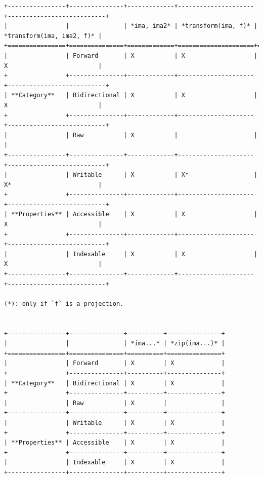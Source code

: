 \begin{verbatim}
+----------------+---------------+-------------+---------------------+---------------------------+
|                |               | *ima, ima2* | *transform(ima, f)* | *transform(ima, ima2, f)* |
+================+===============+=============+=====================+===========================+
|                | Forward       | X           | X                   | X                         |
+                +---------------+-------------+---------------------+---------------------------+
| **Category**   | Bidirectional | X           | X                   | X                         |
+                +---------------+-------------+---------------------+---------------------------+
|                | Raw           | X           |                     |                           |
+----------------+---------------+-------------+---------------------+---------------------------+
|                | Writable      | X           | X*                  | X*                        |
+                +---------------+-------------+---------------------+---------------------------+
| **Properties** | Accessible    | X           | X                   | X                         |
+                +---------------+-------------+---------------------+---------------------------+
|                | Indexable     | X           | X                   | X                         |
+----------------+---------------+-------------+---------------------+---------------------------+

(*): only if `f` is a projection.


+----------------+---------------+----------+---------------+
|                |               | *ima...* | *zip(ima...)* |
+================+===============+==========+===============+
|                | Forward       | X        | X             |
+                +---------------+----------+---------------+
| **Category**   | Bidirectional | X        | X             |
+                +---------------+----------+---------------+
|                | Raw           | X        |               |
+----------------+---------------+----------+---------------+
|                | Writable      | X        | X             |
+                +---------------+----------+---------------+
| **Properties** | Accessible    | X        | X             |
+                +---------------+----------+---------------+
|                | Indexable     | X        | X             |
+----------------+---------------+----------+---------------+


\end{verbatim}
